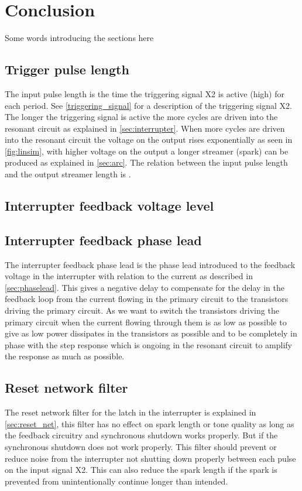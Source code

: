 \chapter{Conclusion}
Some words introducing the sections here

\section{Trigger pulse length}
The input pulse length is the time the triggering signal X2 is active (high) for each period. See \cref{triggering_signal} for a description of the triggering signal X2. The longer the triggering signal is active the more cycles are driven into the resonant circuit as explained in \cref{sec:interrupter}. When more cycles are driven into the resonant circuit the voltage on the output rises exponentially as seen in \cref{fig:linsim}, with higher voltage on the output a longer streamer (spark) can be produced as explained in \cref{sec:arc}. The relation between the input pulse length and the output streamer length is .

\section{Interrupter feedback voltage level}

\section{Interrupter feedback phase lead}
The interrupter feedback phase lead is the phase lead introduced to the feedback voltage in the interrupter with relation to the current as described in \cref{sec:phaselead}. This gives a negative delay to compensate for the delay in the feedback loop from the current flowing in the primary circuit to the transistors driving the primary circuit. As we want to switch the transistors driving the primary circuit when the current flowing through them is as low as possible to give as low power dissipates in the transistors as possible and to be completely in phase with the step response which is ongoing in the resonant circuit to amplify the response as much as possible. 

\section{Reset network filter}
The reset network filter for the latch in the interrupter is explained in \cref{sec:reset_net}, this filter has no effect on spark length or tone quality as long as the feedback circuitry and synchronous shutdown works properly. But if the synchronous shutdown does not work properly. This filter should prevent or reduce noise from the interrupter not shutting down properly between each pulse on the input signal X2. This can also reduce the spark length if the spark is prevented from unintentionally continue longer than intended.

